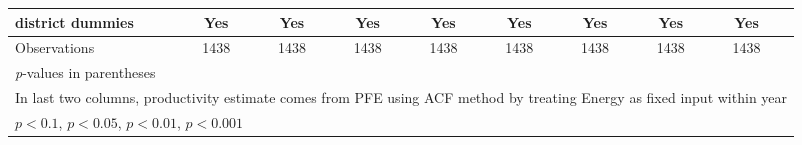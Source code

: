 \begin{table}[htbp]
\begin{tabular}{l*{8}{cc}}
district dummies    &         Yes         &            &         Yes         &            &         Yes         &            &         Yes         &            &         Yes         &            &         Yes         &            &         Yes         &            &         Yes         &            \\
\midrule
Observations        &        1438         &            &        1438         &            &        1438         &            &        1438         &            &        1438         &            &        1438         &            &        1438         &            &        1438         &            \\
\bottomrule
\multicolumn{17}{l}{\footnotesize \textit{p}-values in parentheses}\\
\multicolumn{17}{l}{\footnotesize In last two columns, productivity estimate comes from PFE using ACF method by treating Energy as fixed input within year}\\
\multicolumn{17}{l}{\footnotesize \sym{+} \(p<0.1\), \sym{*} \(p<0.05\), \sym{**} \(p<0.01\), \sym{***} \(p<0.001\)}\\
\end{tabular}
\end{table}
